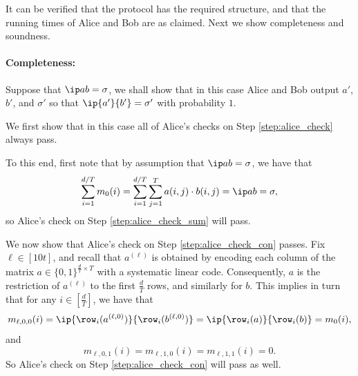 \documentclass[11pt]{article}
\begin{document}
It can be verified that the protocol has the required structure, and that the running times of Alice and Bob are as claimed. Next we show completeness and soundness.


\paragraph{Completeness:}

Suppose that $\ip a b = \sigma$, we shall show that in this case Alice and Bob output $a'$, $b'$, and $\sigma'$ so that $\ip {a'} {b'} = \sigma'$ with probability $1$. 

We first show that in this case all of Alice's checks on Step \ref{step:alice_check} always pass.

To this end, first note that  by assumption that $\ip a b = \sigma$, we have that
\begin{equation}\label{eq:complete_1}
\sum_{i=1}^{d/T} m_0(i) = \sum_{i=1}^{d/T} \sum_{j=1}^T  a(i,j) \cdot b(i,j) = \ip a b = \sigma,
\end{equation} 
so Alice's check on Step \ref{step:alice_check_sum} will pass.

We now show that Alice's check on Step \ref{step:alice_check_con} passes. Fix $\ell \in [10 t]$, and recall that $a^{(\ell)}$ is obtained by encoding each column of the matrix $a \in \{0,1\}^{\frac d T \times T}$ with 
a systematic linear code.
Consequently, $a$ is the restriction of
$a^{(\ell)}$  to the first $\frac d T$ rows, and similarly for $b$.
This implies in turn that  for any $i \in [\frac d T]$, we have that
\begin{equation}\label{eq:complete_2}
m_{\ell,0,0}(i) = \ip{\row_i(a^{(\ell,0)})}  {\row_i(b^{(\ell,0)})} = \ip{\row_i(a)}  {\row_i(b)} = m_0(i),
\end{equation}
and 
\begin{equation}\label{eq:complete_3}
m_{\ell,0,1} (i) = m_{\ell,1,0} (i) = m_{\ell,1,1} (i) =0. 
\end{equation}
So Alice's check on Step \ref{step:alice_check_con} will pass as well.
\end{document}
